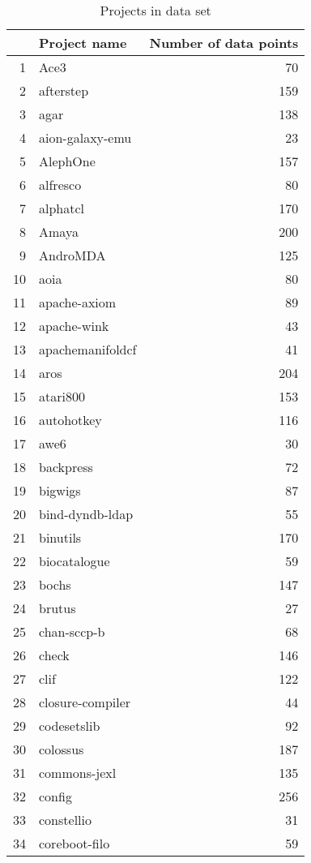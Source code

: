 \newcommand{\tableHeadProjects}{& \bfseries{Project name}\rm & \bfseries{Number
of data points}\rm} \begin{table}[ht]
\caption{Projects in data set}\label{table:projects}
\centering
\begin{tabular}{rlr}
  \hline
  \tableHeadProjects \\ 
  \hline
1 & Ace3 &  70 \\ 
  2 & afterstep & 159 \\ 
  3 & agar & 138 \\ 
  4 & aion-galaxy-emu &  23 \\ 
  5 & AlephOne & 157 \\ 
  6 & alfresco &  80 \\ 
  7 & alphatcl & 170 \\ 
  8 & Amaya & 200 \\ 
  9 & AndroMDA & 125 \\ 
  10 & aoia &  80 \\ 
  11 & apache-axiom &  89 \\ 
  12 & apache-wink &  43 \\ 
  13 & apachemanifoldcf &  41 \\ 
  14 & aros & 204 \\ 
  15 & atari800 & 153 \\ 
  16 & autohotkey & 116 \\ 
  17 & awe6 &  30 \\ 
  18 & backpress &  72 \\ 
  19 & bigwigs &  87 \\ 
  20 & bind-dyndb-ldap &  55 \\ 
  21 & binutils & 170 \\ 
  22 & biocatalogue &  59 \\ 
  23 & bochs & 147 \\ 
  24 & brutus &  27 \\ 
  25 & chan-sccp-b &  68 \\ 
  26 & check & 146 \\ 
  27 & clif & 122 \\ 
  28 & closure-compiler &  44 \\ 
  29 & codesetslib &  92 \\ 
  30 & colossus & 187 \\ 
  31 & commons-jexl & 135 \\ 
  32 & config & 256 \\ 
  33 & constellio &  31 \\ 
  34 & coreboot-filo &  59 \\ 

\end{tabular}
\end{table}
